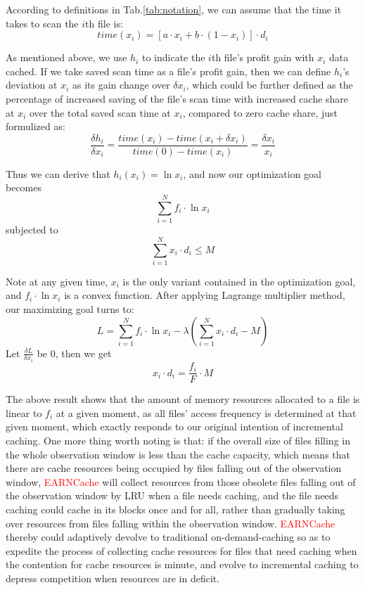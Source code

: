 According to definitions in Tab.\ref{tab:notation}, we can assume that the time it takes to scan the $i$th file is:
\begin{equation}\label{time}
time(x_i)=[a\cdot x_i+b\cdot (1-x_i)]\cdot d_i
\end{equation}

As mentioned above, we use $h_i$ to indicate the $i$th file's profit gain with $x_i$ data cached. If we take saved scan time as a file's profit gain, then we can define $h_i$'s deviation at $x_i$ as its gain change over $\delta x_i$, which could be further defined as the percentage of increased saving of the file's scan time with increased cache share at $x_i$ over the total saved scan time at $x_i$, compared to zero cache share, just formulized as:
\begin{equation}\label{dhi}
\frac{\delta h_i}{\delta x_i}=\frac{time(x_i) - time(x_i+\delta x_i)}{time(0) - time(x_i)}=\frac{\delta x_i}{x_i}
\end{equation}

Thus we can derive that $h_i(x_i)=\ln x_i$, and now our optimization goal becomes
\begin{equation}
\sum_{i=1}^{N} f_i \cdot \ln x_i
\end{equation}
subjected to
\begin{equation}
\sum_{i=1}^{N} x_i\cdot d_i \leq M
\end{equation}

Note at any given time,  $x_i$ is the only variant contained in the optimization goal, and $f_i \cdot \ln x_i$ is a convex function. After applying Lagrange multiplier method, our maximizing goal turns to:
\begin{equation}
L=\sum_{i=1}^{N} f_i\cdot \ln x_i - \lambda (\sum_{i=1}^{N} x_i\cdot d_i - M)
\end{equation}
Let $\frac{\delta L}{\delta x_i}$ be 0, then we get
\begin{equation}\label{xi result}
x_i\cdot d_i= \frac{f_i}{F} \cdot M
\end{equation}

The above result shows that the amount of memory resources allocated to a file is linear to $f_i$ at a given moment, as all files' access frequency is determined at that given moment, which exactly responds to our original intention of incremental caching. One more thing worth noting is that: if the overall size of files filling in the whole observation window is less than the cache capacity, which means that there are cache resources being occupied by files falling out of the observation window, \textcolor{red}{EARNCache} will collect resources from those obsolete files falling out of the observation window by LRU when a file needs caching, and the file needs caching could cache in its blocks once and for all, rather than gradually taking over resources from files falling within the observation window. \textcolor{red}{EARNCache} thereby could adaptively devolve to traditional on-demand-caching so as to expedite the process of collecting cache resources for files that need caching when the contention for cache resources is minute, and evolve to incremental caching to depress competition when resources are in deficit.

